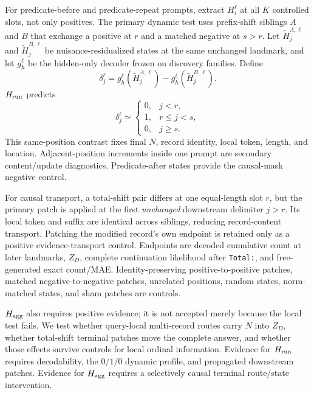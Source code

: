 For predicate-before and predicate-repeat prompts, extract \(H_i^\ell\) at all
\(K\) controlled slots, not only positives. The primary dynamic test uses
prefix-shift siblings \(A\) and \(B\) that exchange a positive at \(r\) and a
matched negative at \(s>r\). Let \(\widetilde H_j^{A,\ell}\) and
\(\widetilde H_j^{B,\ell}\) be nuisance-residualized states at the same
unchanged landmark, and let \(g_h^\ell\) be the hidden-only decoder frozen on
discovery families. Define
\begin{equation}
  \delta_j^\ell=
  g_h^\ell(\widetilde H_j^{A,\ell})
  -
  g_h^\ell(\widetilde H_j^{B,\ell}).
\label{eq:prefix-shift}
\end{equation}
\(H_{\rm run}\) predicts
\[
  \delta_j^\ell\simeq
  \begin{cases}
    0,&j<r,\\
    1,&r\leq j<s,\\
    0,&j\geq s.
  \end{cases}
\]
This same-position contrast fixes final \(N\), record identity, local token,
length, and location. Adjacent-position increments inside one prompt are
secondary content/update diagnostics. Predicate-after states provide the
causal-mask negative control.

For causal transport, a total-shift pair differs at one equal-length slot
\(r\), but the primary patch is applied at the first \emph{unchanged}
downstream delimiter \(j>r\). Its local token and suffix are identical across
siblings, reducing record-content transport. Patching the modified record's
own endpoint is retained only as a positive evidence-transport control.
Endpoints are decoded cumulative count at later landmarks, \(Z_D\), complete
continuation likelihood after \texttt{Total:}, and free-generated exact
count/MAE. Identity-preserving positive-to-positive patches, matched
negative-to-negative patches, unrelated positions, random states,
norm-matched states, and sham patches are controls.

\(H_{\rm agg}\) also requires positive evidence; it is not accepted merely
because the local test fails. We test whether query-local multi-record routes
carry \(N\) into \(Z_D\), whether total-shift terminal patches move the
complete answer, and whether those effects survive controls for local ordinal
information. Evidence for \(H_{\rm run}\) requires decodability, the
\(0/1/0\) dynamic profile, and propagated downstream patches. Evidence for
\(H_{\rm agg}\) requires a selectively causal terminal route/state
intervention.

